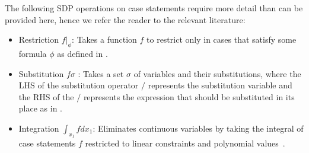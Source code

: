 \documentclass{article} %
\begin{document}
The following SDP operations on case statements require more detail than can be provided here, hence we refer the reader to the relevant literature:
\begin{itemize}
\item Restriction $f|_{\phi}$:  Takes a function $f$ to restrict only in cases
that satisfy some formula $\phi$ as defined in \cite{sanner_uai11}.
\item Substitution $f\sigma$ : Takes a set $\sigma$ of variables and their substitutions, where the LHS of the substitution operator $/$ represents the substitution variable and the RHS of the $/$ represents the expression that should be substituted in its place as in \cite{sanner_uai11}.
\item Integration $\int_{x_1} f dx_1$:  Eliminates continuous variables by taking the integral of case statements $f$ restricted to linear constraints and polynomial values~\cite{sanner_aaai12}.
\end{itemize}
\vspace{-2mm}
\end{document}
